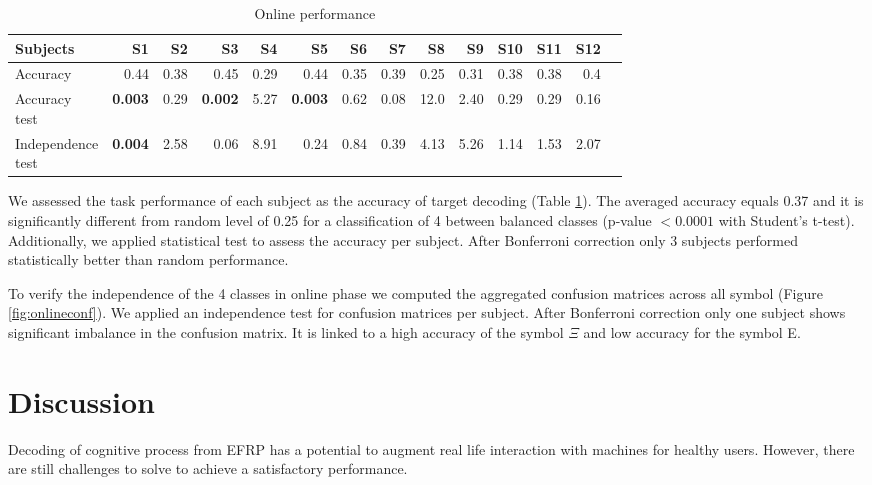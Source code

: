 \documentclass[12pt]{iopart}
\begin{document}
\begin{table}
    \centering
    \caption{Online performance}
    \scriptsize
    \renewcommand{\arraystretch}{1.5}
    \begin{tabular}{l r r r r r r r r r r r r r}
        \hline
        Subjects & S1 & S2 & S3 & S4 & S5 & S6 & S7 & S8 & S9 & S10 & S11 & S12 \\
        \hline

        Accuracy & 0.44 & 0.38 & 0.45 & 0.29 & 0.44 & 0.35 & 0.39 & 0.25 & 0.31 & 0.38 & 0.38 & 0.4 \\ 
        \shortstack{Accuracy \\ test} & \textbf{0.003} & 0.29 & \textbf{0.002} & 5.27 & \textbf{0.003} & 0.62 & 0.08 & 12.0 & 2.40 & 0.29 & 0.29 &
        0.16 \\
        \shortstack{Independence \\ test}  & \textbf{ 0.004} & 2.58 & 0.06 & 8.91 & 0.24 & 0.84 & 0.39 & 4.13 & 5.26 & 1.14 & 1.53
        & 2.07 \\
        \hline
    \end{tabular}
    \label{tab:onlineperf}
\end{table}

We assessed the task performance of each subject as the accuracy of
target decoding (Table \ref{tab:onlineperf}). The averaged accuracy 
equals 0.37 and it is significantly different from random level of 0.25 for
a classification of 4 between balanced classes (p-value $< 0.0001$ with Student's t-test).
Additionally, we applied statistical test to assess the accuracy per subject.
After Bonferroni correction only 3 subjects performed statistically better than random performance.

To verify the independence of the 4 classes in online phase
we computed the aggregated confusion matrices across all symbol (Figure \ref{fig:onlineconf}).
We applied an independence test for confusion matrices per subject.
After Bonferroni correction only one subject shows significant imbalance in the
confusion matrix. It is linked to a high accuracy of the symbol $\Xi$ and low accuracy 
for the symbol E.


\section{Discussion}
\label{sec:discussion}
Decoding of cognitive process from EFRP has a potential to augment
real life interaction with machines for healthy users.
However, there are still challenges to solve to achieve
a satisfactory performance.
\end{document}
